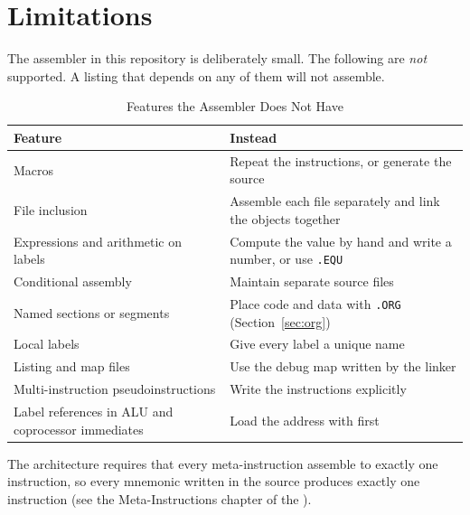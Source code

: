 \chapter{Limitations}
\label{ch:limitations}

The assembler in this repository is deliberately small. The following are \emph{not} supported. A listing that depends
on any of them will not assemble.

\begin{table}[H]
	\centering
	\begin{tabularx}{\textwidth}{p{}X}
		\toprule
		\textbf{Feature}                                   & \textbf{Instead}                                                   \\
		\midrule
		Macros                                             & Repeat the instructions, or generate the source                    \\
		File inclusion                                     & Assemble each file separately and link the objects together        \\
		Expressions and arithmetic on labels               & Compute the value by hand and write a number, or use \texttt{.EQU} \\
		Conditional assembly                               & Maintain separate source files                                     \\
		Named sections or segments                         & Place code and data with \texttt{.ORG} (Section~\ref{sec:org})     \\
		Local labels                                       & Give every label a unique name                                     \\
		Listing and map files                              & Use the debug map written by the linker                            \\
		Multi-instruction pseudoinstructions               & Write the instructions explicitly                                  \\
		Label references in ALU and coprocessor immediates & Load the address with \mnemonic{MOVI} first                        \\
		\bottomrule
	\end{tabularx}
	\caption{Features the Assembler Does Not Have}
	\label{tab:unsupported}
\end{table}

The architecture requires that every meta-instruction assemble to exactly one instruction, so every mnemonic written in
the source produces exactly one instruction (see the Meta-Instructions chapter of the \archmanual{}).

